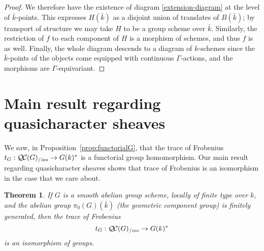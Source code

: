 \documentclass[11pt]{amsart}
\theoremstyle{plain}
\newtheorem{theorem}{Theorem}[section]
\theoremstyle{definition}
\theoremstyle{remark}
\newcommand{\bFq}{\bar{k}}
\newcommand{\Fq}{k}
\newcommand{\QC}{{\mathcal{Q\hskip-0.8pt C}}}
\newcommand{\QCiso}[1]{\QC(#1)_{/\textit{iso}}}
\newcommand{\trFrob}[1]{t_{#1}}
\begin{document}
\begin{proof}
  We therefore have the existence of diagram \eqref{extension-diagram}
  at the level of $\bFq$-points.  This expresses $H(\bFq)$ as a
  disjoint union of translates of $B(\bFq)$; by transport of structure
  we may take $H$ to be a group scheme over $\bFq$.  Similarly, the
  restriction of $f$ to each component of $H$ is a morphism of
  schemes, and thus $f$ is as well.  Finally, the whole diagram
  descends to a diagram of $\Fq$-schemes since the $\bFq$-points of
  the objects come equipped with continuous $\Gamma$-actions, and the
  morphisms are $\Gamma$-equivariant.
\end{proof}

\section{Main result regarding quasicharacter sheaves}
\label{sec:snake}

We saw, in Proposition~\ref{prop:functorialG}, that the trace of Frobenius  $\trFrob{G} : \QCiso{G} \to G(\Fq)^*$ is a functorial group homomorphism. Our main result regarding quasicharacter sheaves shows that trace of Frobenius is an isomorphism in the case that we care about.

%
\begin{theorem}\label{thm:snake}
  If $G$ is a smooth abelian group scheme, locally of finite type over
  $\Fq$, and the abelian group $\pi_0(G)(\bFq)$ (the geometric
  component group) is finitely generated, then the trace of Frobenius
  \[
  \trFrob{G} : \QCiso{G} \to G(\Fq)^*
  \]
  is an isomorphism of groups.
\end{theorem}
\end{document}
